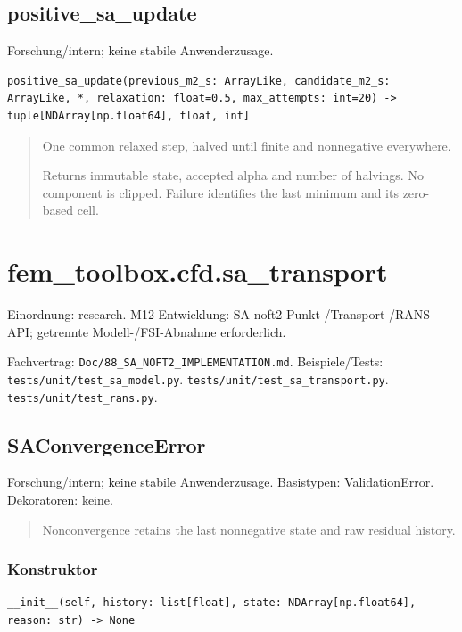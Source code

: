 \subsection{positive\_sa\_update}
Forschung/intern; keine stabile Anwenderzusage.
\begin{lstlisting}
positive_sa_update(previous_m2_s: ArrayLike, candidate_m2_s: ArrayLike, *, relaxation: float=0.5, max_attempts: int=20) -> tuple[NDArray[np.float64], float, int]
\end{lstlisting}
\begin{quote}
One common relaxed step, halved until finite and nonnegative everywhere.\par Returns immutable state, accepted alpha and number of halvings. No component is clipped. Failure identifies the last minimum and its zero-based cell.
\end{quote}
\section{fem\_toolbox.cfd.sa\_transport}
Einordnung: research. M12-Entwicklung: SA-noft2-Punkt-/Transport-/RANS-API; getrennte Modell-/FSI-Abnahme erforderlich.
\par Fachvertrag: \nolinkurl{Doc/88_SA_NOFT2_IMPLEMENTATION.md}. Beispiele/Tests:
\nolinkurl{tests/unit/test_sa_model.py}.
\nolinkurl{tests/unit/test_sa_transport.py}.
\nolinkurl{tests/unit/test_rans.py}.
\subsection{SAConvergenceError}
Forschung/intern; keine stabile Anwenderzusage.
Basistypen: ValidationError. Dekoratoren: keine.
\begin{quote}
Nonconvergence retains the last nonnegative state and raw residual history.
\end{quote}
\subsubsection*{Konstruktor}
\begin{lstlisting}
__init__(self, history: list[float], state: NDArray[np.float64], reason: str) -> None
\end{lstlisting}
